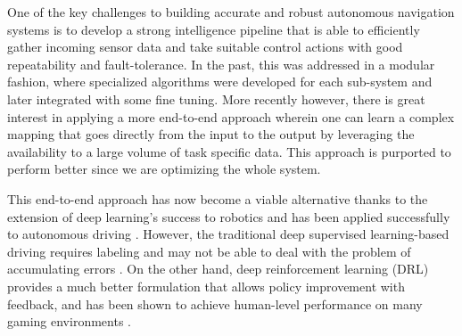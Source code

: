 \documentclass[../thesis.tex]{subfiles}
\begin{document}

One of the key challenges to building accurate and robust autonomous navigation systems is to develop a strong intelligence pipeline that is able to efficiently gather incoming sensor data and take suitable control actions with good repeatability and fault-tolerance. In the past, this was addressed in a modular fashion, where  specialized algorithms were developed for each sub-system and later integrated with some fine tuning. More recently however, there is great interest in applying a more end-to-end approach wherein one can learn a complex mapping that goes directly from the input to the output by leveraging the availability to a large volume of task specific data. This approach is purported to perform better since we are optimizing the whole system. 


This end-to-end approach has now become a viable alternative thanks to the extension of deep learning's success to robotics and has been applied successfully to autonomous driving \cite{deepdriving,nvidiacar,endtoendcars}. 
However, the traditional deep supervised learning-based driving requires labeling and may not be able to deal with the problem of accumulating errors \cite{ross2011reduction}. On the other hand, deep reinforcement learning (DRL) provides a much better formulation that allows policy improvement with feedback, and has been shown to achieve human-level performance on many gaming environments \cite{mnih2013playing, mnih2015human,2016-TOG-deepRL}.
\end{document}
